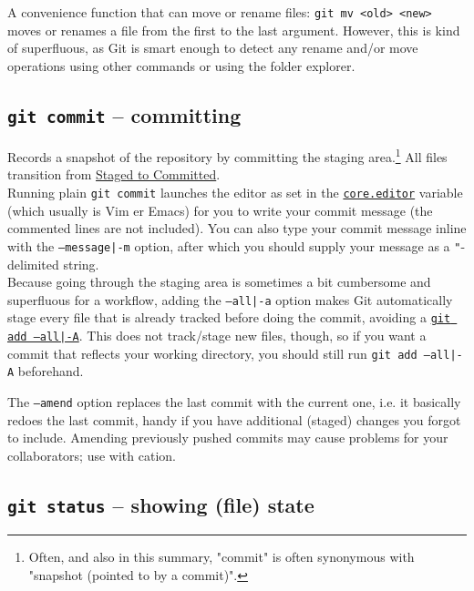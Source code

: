 \documentclass[table, xcdraw]{article}%
\begin{document}
A convenience function that can move or rename files: \texttt{git mv <old> <new>} moves or renames a file from the first to the last argument. However, this is kind of superfluous, as Git is smart enough to detect any rename and/or move operations using other commands or using the folder explorer.

\subsection{\texttt{git commit} -- committing} \label{commit}

Records a snapshot of the repository by committing the staging area.\footnote{Often, and also in this summary, "commit" is often synonymous with "snapshot (pointed to by a commit)".} All files transition from \hyperref[states]{Staged to Committed}.\\
Running plain \texttt{git commit} launches the editor as set in the \hyperref[config]{\texttt{core.editor}} variable (which usually is Vim er Emacs) for you to write your commit message (the commented lines are not included). You can also type your commit message inline with the \texttt{--message|-m} option, after which you should supply your message as a \texttt{"}-delimited string.\\
Because going through the staging area is sometimes a bit cumbersome and superfluous for a workflow, adding the \texttt{--all|-a} option makes Git automatically stage every file that is already tracked before doing the commit, avoiding a \hyperref[add]{\texttt{git add --all|-A}}. This does not track/stage new files, though, so if you want a commit that reflects your working directory, you should still run \texttt{git add --all|-A} beforehand.

The \texttt{--amend} option replaces the last commit with the current one, i.e. it basically redoes the last commit, handy if you have additional (staged) changes you forgot to include. Amending previously pushed commits may cause problems for your collaborators; use with cation.

\subsection{\texttt{git status} -- showing (file) state} \label{status}
\end{document}
